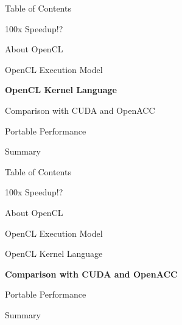 \begin{frame}{Table of Contents}
 \begin{block}{100x Speedup!?} \end{block}
 \begin{block}{About OpenCL} \end{block}
 \begin{block}{OpenCL Execution Model} \end{block}
 \begin{block}{\textbf{OpenCL Kernel Language}} \end{block}
 \begin{block}{Comparison with CUDA and OpenACC} \end{block}
 \begin{block}{Portable Performance} \end{block}
 \begin{block}{Summary} \end{block}
\end{frame}




\begin{frame}{Table of Contents}
 \begin{block}{100x Speedup!?} \end{block}
 \begin{block}{About OpenCL} \end{block}
 \begin{block}{OpenCL Execution Model} \end{block}
 \begin{block}{OpenCL Kernel Language} \end{block}
 \begin{block}{\textbf{Comparison with CUDA and OpenACC}} \end{block}
 \begin{block}{Portable Performance} \end{block}
 \begin{block}{Summary} \end{block}
\end{frame}





